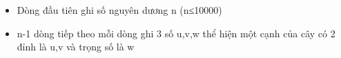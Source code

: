 \begin{itemize}
	\item     Dòng đầu tiên ghi số nguyên dương n (n≤10000)   
	\item     n-1 dòng tiếp theo mỗi dòng ghi 3 số u,v,w thể hiện một cạnh của cây có 2 đỉnh là u,v và trọng số là w   
\end{itemize}